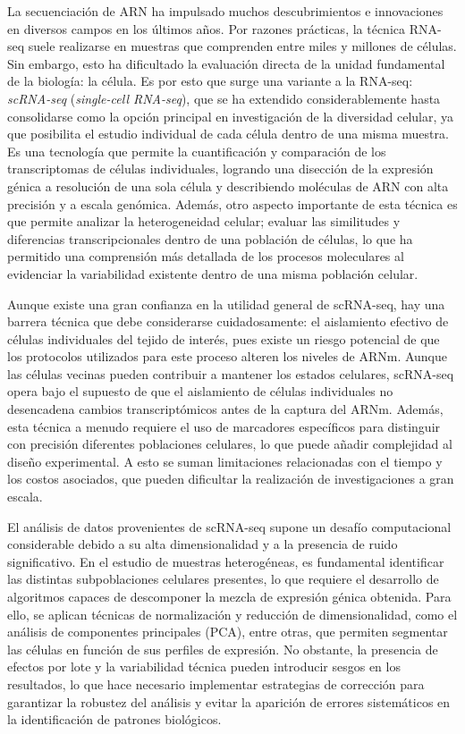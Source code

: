 La secuenciación de ARN ha impulsado muchos descubrimientos e innovaciones en diversos campos en los últimos años. Por razones prácticas, la técnica RNA-seq
suele realizarse en muestras que comprenden entre miles y millones de células. Sin embargo, esto ha dificultado la evaluación directa de la unidad fundamental
de la biología: la célula. Es por esto que surge una variante a la RNA-seq: \textit{scRNA-seq} (\textit{single-cell RNA-seq}), que se ha extendido considerablemente hasta 
consolidarse como la opción principal en investigación de la diversidad celular, ya que posibilita el estudio individual de cada célula dentro de una misma muestra. 
Es una tecnología que permite la cuantificación y comparación de los transcriptomas de células individuales, logrando una disección de la expresión génica a resolución de una 
sola célula y describiendo moléculas de ARN con alta precisión y a escala genómica. Además, otro aspecto importante de esta técnica es que permite analizar 
la heterogeneidad celular; evaluar las similitudes y diferencias transcripcionales dentro de una población de células, lo que ha permitido una comprensión más 
detallada de los procesos moleculares al evidenciar la variabilidad existente dentro de una misma población celular. \newline

Aunque existe una gran confianza en la utilidad general de scRNA-seq, hay una barrera técnica que debe considerarse cuidadosamente: el aislamiento efectivo de 
células individuales del tejido de interés, pues existe un riesgo potencial de que los protocolos utilizados para este proceso alteren los niveles de ARNm. 
Aunque las células vecinas pueden contribuir a mantener los estados celulares, scRNA-seq opera bajo el supuesto de que el aislamiento de células individuales 
no desencadena cambios transcriptómicos antes de la captura del ARNm. Además, esta técnica a menudo requiere el uso de marcadores específicos para distinguir 
con precisión diferentes poblaciones celulares, lo que puede añadir complejidad al diseño experimental. A esto se suman limitaciones relacionadas con el tiempo 
y los costos asociados, que pueden dificultar la realización de investigaciones a gran escala. \newline

El análisis de datos provenientes de scRNA-seq supone un desafío computacional considerable debido a su alta dimensionalidad y a la presencia de ruido significativo. 
En el estudio de muestras heterogéneas, es fundamental identificar las distintas subpoblaciones celulares presentes, lo que requiere el desarrollo de algoritmos 
capaces de descomponer la mezcla de expresión génica obtenida. Para ello, se aplican técnicas de normalización y reducción de dimensionalidad, como el análisis 
de componentes principales (PCA), entre otras, que permiten segmentar las células en función de sus perfiles de 
expresión. No obstante, la presencia de efectos por lote y la variabilidad técnica pueden introducir sesgos en los resultados, lo que hace necesario implementar 
estrategias de corrección para garantizar la robustez del análisis y evitar la aparición de errores sistemáticos en la identificación de patrones biológicos. \newline

